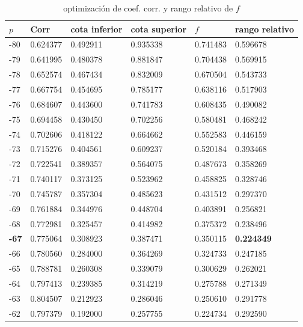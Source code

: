 \begin{table}[]
\centering
\caption{optimización de coef. corr. y rango relativo de $f$}
\label{tab:opt}
\begin{tabular}{|l|l|ll|ll|}
\hline
$p$   & Corr     & cota inferior & cota superior & $f$        & rango relativo \\
\hline
-80 & 0.624377 & 0.492911      & 0.935338      & 0.741483 & 0.596678       \\
-79 & 0.641995 & 0.480378      & 0.881847      & 0.704438 & 0.569915       \\
-78 & 0.652574 & 0.467434      & 0.832009      & 0.670504 & 0.543733       \\
-77 & 0.667754 & 0.454695      & 0.785177      & 0.638116 & 0.517903       \\
-76 & 0.684607 & 0.443600      & 0.741783      & 0.608435 & 0.490082       \\
-75 & 0.694458 & 0.430450      & 0.702256      & 0.580481 & 0.468242       \\
-74 & 0.702606 & 0.418122      & 0.664662      & 0.552583 & 0.446159       \\
-73 & 0.715276 & 0.404561      & 0.609237      & 0.520184 & 0.393468       \\
-72 & 0.722541 & 0.389357      & 0.564075      & 0.487673 & 0.358269       \\
-71 & 0.740117 & 0.373125      & 0.523962      & 0.458825 & 0.328746       \\
-70 & 0.745787 & 0.357304      & 0.485623      & 0.431512 & 0.297370       \\
-69 & 0.761884 & 0.344976      & 0.448704      & 0.403891 & 0.256821       \\
-68 & 0.772981 & 0.325457      & 0.414982      & 0.375372 & 0.238496       \\
\textbf{-67} & 0.775064 & 0.308923      & 0.387471      & 0.350115 & \textbf{0.224349}       \\
-66 & 0.780560 & 0.284000      & 0.364269      & 0.324733 & 0.247185       \\
-65 & 0.788781 & 0.260308      & 0.339079      & 0.300629 & 0.262021       \\
-64 & 0.797413 & 0.239385      & 0.314219      & 0.275788 & 0.271349       \\
-63 & 0.804507 & 0.212923      & 0.286046      & 0.250610 & 0.291778       \\
-62 & 0.797379 & 0.192000      & 0.257755      & 0.224734 & 0.292590       \\

\end{tabular}
\end{table}
